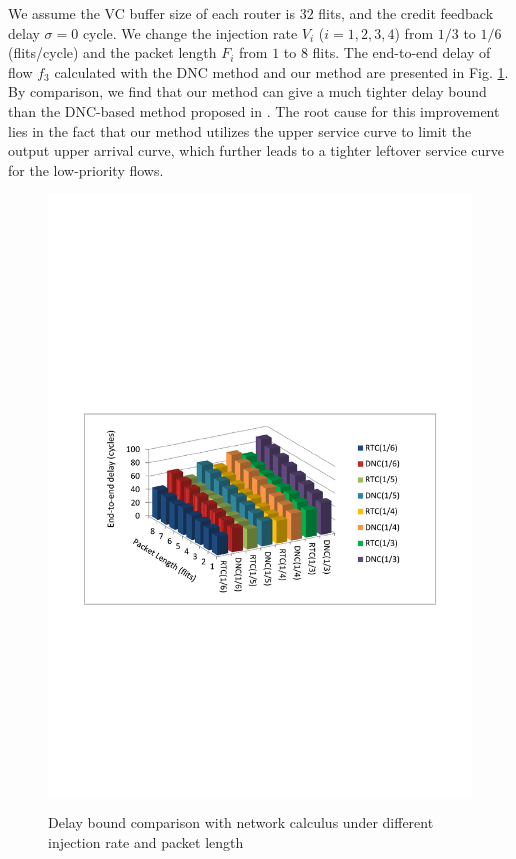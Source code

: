\documentclass[preprint]{elsarticle}
\begin{document}
We assume the VC buffer size of each router is $32$ flits, and the credit feedback delay $\sigma=0$ cycle. We change the injection rate $V_i$ ($i=1,2,3,4$) from $1/3$ to $1/6$ (flits/cycle) and the packet length $F_i$ from $1$ to $8$ flits. The end-to-end delay of flow $f_3$ calculated with the DNC method and our method are presented in Fig. \ref{comparison}. By comparison, we find that our method can give a much tighter delay bound than the DNC-based method proposed in \cite{Qian489900}. The root cause for this improvement lies in the fact that our method utilizes the upper service curve to limit the output upper arrival curve, which further leads to a tighter leftover service curve for the low-priority flows.
\begin{figure}
  \centering
  \includegraphics[scale=0.8]{fig9.pdf}\\
  \caption{Delay bound comparison with network calculus under different injection rate and packet length}\label{comparison}
\end{figure}
\end{document}
